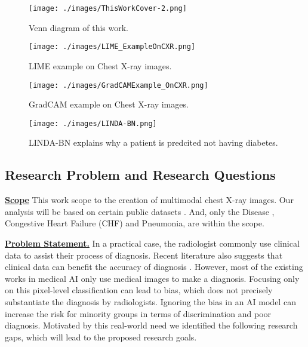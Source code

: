 \begin{figure}[!h]
    \centering
    \texttt{[image: ./images/ThisWorkCover-2.png]}
    \caption{Venn diagram of this work.}
    \label{fig: this_work_cover}
\end{figure}

\begin{figure}[!h]
    \centering
    \texttt{[image: ./images/LIME\_ExampleOnCXR.png]}
    \caption{LIME example on Chest X-ray images. \citep{Teixeira2021LIMEAndGradCAMOnCXR}}
    \label{fig: LIME_ExampleOnCXR}
\end{figure}

\begin{figure}[!h]
    \centering
    \texttt{[image: ./images/GradCAMExample\_OnCXR.png]}
    \caption{GradCAM example on Chest X-ray images. \citep{Teixeira2021LIMEAndGradCAMOnCXR}}
    \label{fig: GradCAMExample_OnCXR}
\end{figure}

\begin{figure}[!h]
    \centering
    \texttt{[image: ./images/LINDA-BN.png]}
    \caption{LINDA-BN explains why a patient is predcited not having diabetes. \citep{Moreira2021LINDA}}
    \label{fig: LINDA-BN_diabetes}
\end{figure}



\lipsum[1]

\subsection{Research Problem and Research Questions}

\underline{\textbf{Scope}} This work scope to the creation of multimodal chest X-ray images. Our analysis will be based on certain public datasets \citep{Johnson2021MIMIC_IV, Johnson2019MIMIC_CXR, Johnson2021MIMIC_IV_ED, Lanfredi2021REFLACX, Karargyris2020EyeGazeDataset}. And, only the Disease , Congestive Heart Failure (CHF) and Pneumonia, are within the scope.

\noindent
\underline{\textbf{Problem Statement.}}
In a practical case, the radiologist commonly use clinical data to assist their process of diagnosis. Recent literature also suggests that clinical data can benefit the accuracy of diagnosis \citep{Castillo2020ClinicalInformationOnRadiology, Leslie2000CTClinicalData}. However, most of the existing works in medical AI only use medical images to make a diagnosis. Focusing only on this pixel-level classification can lead to bias, which does not precisely substantiate the diagnosis by radiologists. Ignoring the bias in an AI model can increase the risk for minority groups in terms of discrimination and poor diagnosis. Motivated by this real-world need we identified the following research gaps, which will lead to the proposed research goals.

